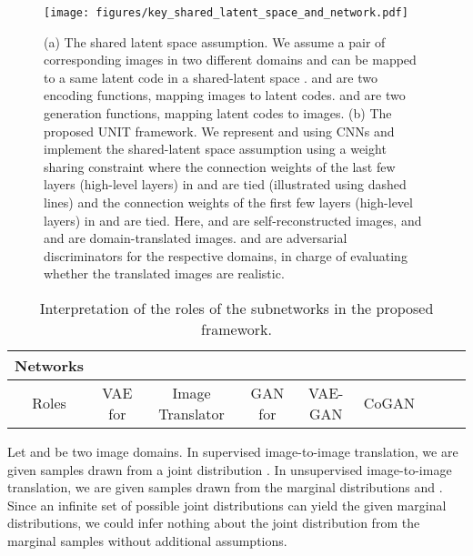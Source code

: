 \documentclass{article}
\begin{document}
\begin{figure*}[t]
\centering
\texttt{[image: figures/key\_shared\_latent\_space\_and\_network.pdf]}
\caption{\small (a) The shared latent space assumption. We assume a pair of corresponding images  in two different domains  and  can be mapped to a same latent code  in a shared-latent space .  and  are two encoding functions, mapping images to latent codes.  and  are two generation functions, mapping latent codes to images. (b) The proposed UNIT framework. We represent    and  using CNNs and implement the shared-latent space assumption using a weight sharing constraint where the connection weights of the last few layers (high-level layers) in  and  are tied (illustrated using dashed lines) and the connection weights of the first few layers (high-level layers) in  and  are tied. Here,  and  are self-reconstructed images, and  and  are domain-translated images.  and  are adversarial discriminators for the respective domains, in charge of evaluating whether the translated images are realistic.}
\label{fig::network}
\vspace{-4 mm}
\end{figure*}
\begin{table}[t]
\caption{\small Interpretation of the roles of the subnetworks in the proposed framework.}\label{tbl::subnetworks}
\centering
\small
{\tabcolsep=4pt
\begin{tabularx}{395pt}{c|cccccccc}\toprule
Networks & 
 &
 & 
 & 
 & 
 \tabularnewline\midrule
Roles &
VAE for  &
Image Translator  &
GAN for  & 
VAE-GAN \cite{larsen2015autoencoding} & 
CoGAN \cite{liu2016coupled}
\tabularnewline\midrule
\end{tabularx}}
\vspace{-4mm}
\end{table}


Let  and  be two image domains. In supervised image-to-image translation, we are given samples  drawn from a joint distribution . In unsupervised image-to-image translation, we are given samples drawn from the marginal distributions  and . Since an infinite set of possible joint distributions can yield the given marginal distributions, we could infer nothing about the joint distribution from the marginal samples without additional assumptions.
\end{document}
